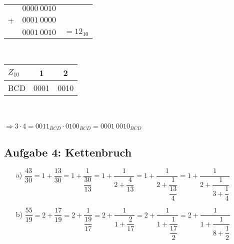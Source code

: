 \documentclass{article}
\begin{document}
\begin{enumerate}
\begin{minipage}[t]{0.4\textwidth}
\begin{tabular}{crl}
        		  &  $0000\:0010$ &   \\
        		+ &  $0001\:0000$ &   \\ \hline
        		  &  $0001\:0010$ &$=12_{10}$
        	\end{tabular}
        \end{minipage}
    	\begin{minipage}[t]{0.2\textwidth}
    		\hfill \\
    		\begin{tabular}{l|cc}
    			$Z_{10}$ &  1   &  2   \\ \hline
    			BCD      & 0001 & 0010
    		\end{tabular}
    	\end{minipage}\\\\
        $\Rightarrow 3\cdot 4=0011_{BCD}\cdot 0100_{BCD}=0001\:0010_{BCD}$
    \end{enumerate}


    \subsection*{Aufgabe 4: Kettenbruch}
    \begin{enumerate}
        \item[a)]$\dfrac{43}{30}=1+\dfrac{13}{30}=1+\dfrac{1}{\dfrac{30}{13}}=1+\dfrac{1}{2+\dfrac{4}{13}}=1+\dfrac{1}{2+\dfrac{1}{\dfrac{13}{4}}}=1+\dfrac{1}{2+\dfrac{1}{3+\dfrac{1}{4}}}$
        \item[b)]$\dfrac{55}{19}=2+\dfrac{17}{19}=2+\dfrac{1}{\dfrac{19}{17}}=2+\dfrac{1}{1+\dfrac{2}{17}}=2+\dfrac{1}{1+\dfrac{1}{\dfrac{17}{2}}}=2+\dfrac{1}{1+\dfrac{1}{8+\dfrac{1}{2}}}$
    \end{enumerate}
\end{document}
